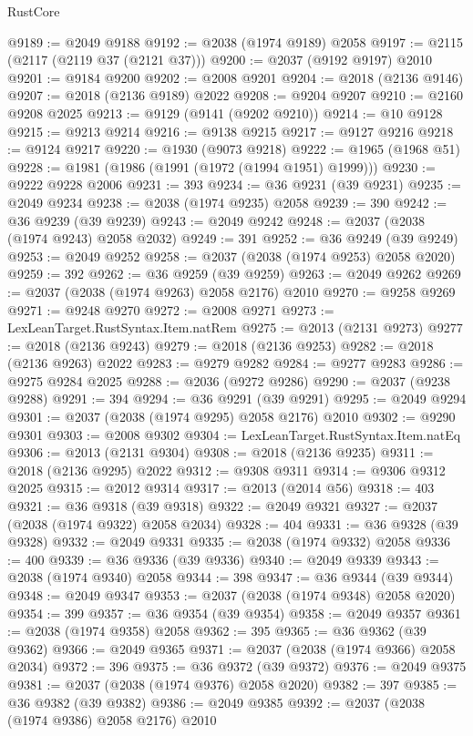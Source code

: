 \begin{lexlean}{RustCore}
\begin{coremodule}
@9189 := @2049 @9188
@9192 := @2038 (@1974 @9189) @2058
@9197 := @2115 (@2117 (@2119 @37 (@2121 @37)))
@9200 := @2037 (@9192 @9197) @2010
@9201 := @9184 @9200
@9202 := @2008 @9201
@9204 := @2018 (@2136 @9146)
@9207 := @2018 (@2136 @9189) @2022
@9208 := @9204 @9207
@9210 := @2160 @9208 @2025
@9213 := @9129 (@9141 (@9202 @9210))
@9214 := @10 @9128
@9215 := @9213 @9214
@9216 := @9138 @9215
@9217 := @9127 @9216
@9218 := @9124 @9217
@9220 := @1930 (@9073 @9218)
@9222 := @1965 (@1968 @51)
@9228 := @1981 (@1986 (@1991 (@1972 (@1994 @1951) @1999)))
@9230 := @9222 @9228 @2006
@9231 := 393
@9234 := @36 @9231 (@39 @9231)
@9235 := @2049 @9234
@9238 := @2038 (@1974 @9235) @2058
@9239 := 390
@9242 := @36 @9239 (@39 @9239)
@9243 := @2049 @9242
@9248 := @2037 (@2038 (@1974 @9243) @2058 @2032)
@9249 := 391
@9252 := @36 @9249 (@39 @9249)
@9253 := @2049 @9252
@9258 := @2037 (@2038 (@1974 @9253) @2058 @2020)
@9259 := 392
@9262 := @36 @9259 (@39 @9259)
@9263 := @2049 @9262
@9269 := @2037 (@2038 (@1974 @9263) @2058 @2176) @2010
@9270 := @9258 @9269
@9271 := @9248 @9270
@9272 := @2008 @9271
@9273 := LexLeanTarget.RustSyntax.Item.natRem
@9275 := @2013 (@2131 @9273)
@9277 := @2018 (@2136 @9243)
@9279 := @2018 (@2136 @9253)
@9282 := @2018 (@2136 @9263) @2022
@9283 := @9279 @9282
@9284 := @9277 @9283
@9286 := @9275 @9284 @2025
@9288 := @2036 (@9272 @9286)
@9290 := @2037 (@9238 @9288)
@9291 := 394
@9294 := @36 @9291 (@39 @9291)
@9295 := @2049 @9294
@9301 := @2037 (@2038 (@1974 @9295) @2058 @2176) @2010
@9302 := @9290 @9301
@9303 := @2008 @9302
@9304 := LexLeanTarget.RustSyntax.Item.natEq
@9306 := @2013 (@2131 @9304)
@9308 := @2018 (@2136 @9235)
@9311 := @2018 (@2136 @9295) @2022
@9312 := @9308 @9311
@9314 := @9306 @9312 @2025
@9315 := @2012 @9314
@9317 := @2013 (@2014 @56)
@9318 := 403
@9321 := @36 @9318 (@39 @9318)
@9322 := @2049 @9321
@9327 := @2037 (@2038 (@1974 @9322) @2058 @2034)
@9328 := 404
@9331 := @36 @9328 (@39 @9328)
@9332 := @2049 @9331
@9335 := @2038 (@1974 @9332) @2058
@9336 := 400
@9339 := @36 @9336 (@39 @9336)
@9340 := @2049 @9339
@9343 := @2038 (@1974 @9340) @2058
@9344 := 398
@9347 := @36 @9344 (@39 @9344)
@9348 := @2049 @9347
@9353 := @2037 (@2038 (@1974 @9348) @2058 @2020)
@9354 := 399
@9357 := @36 @9354 (@39 @9354)
@9358 := @2049 @9357
@9361 := @2038 (@1974 @9358) @2058
@9362 := 395
@9365 := @36 @9362 (@39 @9362)
@9366 := @2049 @9365
@9371 := @2037 (@2038 (@1974 @9366) @2058 @2034)
@9372 := 396
@9375 := @36 @9372 (@39 @9372)
@9376 := @2049 @9375
@9381 := @2037 (@2038 (@1974 @9376) @2058 @2020)
@9382 := 397
@9385 := @36 @9382 (@39 @9382)
@9386 := @2049 @9385
@9392 := @2037 (@2038 (@1974 @9386) @2058 @2176) @2010

\end{coremodule}
\end{lexlean}
